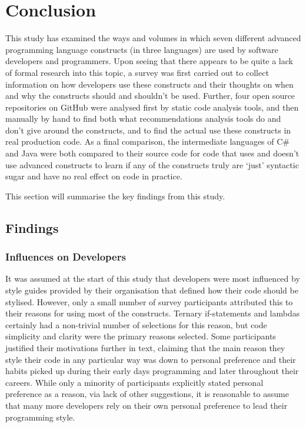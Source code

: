 \documentclass{article}
\begin{document}
\section{Conclusion}
\label{sec:conclusion}
    This study has examined the ways and volumes in which seven different advanced programming language constructs (in three languages) are used by software developers and programmers. Upon seeing that there appears to be quite a lack of formal research into this topic, a survey was first carried out to collect information on how developers use these constructs and their thoughts on when and why the constructs should and shouldn't be used. Further, four open source repositories on GitHub were analysed first by static code analysis tools, and then manually by hand to find both what recommendations analysis tools do and don't give around the constructs, and to find the actual use these constructs in real production code. As a final comparison, the intermediate languages of C\# and Java were both compared to their source code for code that uses and doesn't use advanced constructs to learn if any of the constructs truly are `just' syntactic sugar and have no real effect on code in practice.
    
    This section will summarise the key findings from this study.

    \subsection{Findings}
        \subsubsection{Influences on Developers}
            It was assumed at the start of this study that developers were most influenced by style guides provided by their organisation that defined how their code should be stylised. However, only a small number of survey participants attributed this to their reasons for using most of the constructs. Ternary if-statements and lambdas certainly had a non-trivial number of selections for this reason, but code simplicity and clarity were the primary reasons selected. Some participants justified their motivations further in text, claiming that the main reason they style their code in any particular way was down to personal preference and their habits picked up during their early days programming and later throughout their careers. While only a minority of participants explicitly stated personal preference as a reason, via lack of other suggestions, it is reasonable to assume that many more developers rely on their own personal preference to lead their programming style.
\end{document}
